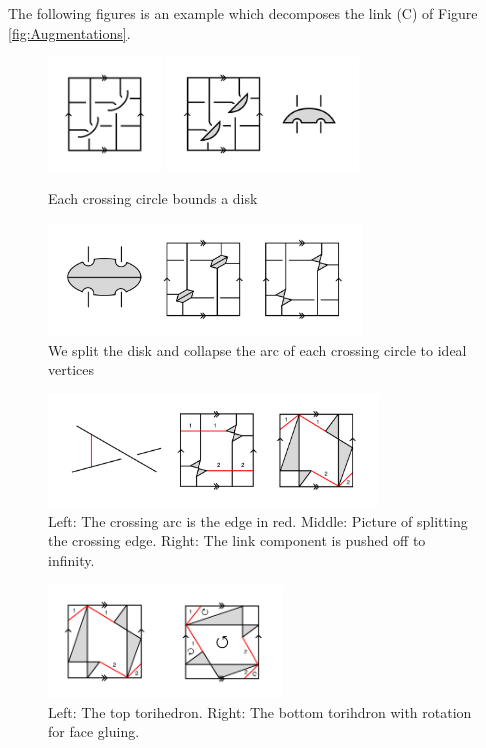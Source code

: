 \documentclass[11pt]{amsart}
\theoremstyle{plain}
\theoremstyle{definition}
\begin{document}
The following figures is an example which decomposes the link (C) of Figure \ref{fig:Augmentations}.
 \begin{figure}[h]
 \centering
 \includegraphics [height=3cm]{fig-3}
 \includegraphics [height=3cm]{fig-4}
 \caption{Each crossing circle bounds a disk}
 \end{figure}
 
 \vspace*{-0.5cm}
  \begin{figure}[h]
\centering
 \includegraphics [height=3cm]{fig-5}
 \caption{We split the disk and collapse the arc of each crossing circle to ideal vertices}
 \end{figure}
 
  \vspace*{-0.5cm}
  \begin{figure}[h]
 \centering
 \includegraphics [height=3cm]{fig-6}
 \caption{Left: The crossing arc is the edge in red. Middle: Picture of splitting the crossing edge. Right: The link component is pushed off to infinity.}
 \end{figure}

 \vspace*{-0.5cm}
 \begin{figure}[h]
 \centering
 \includegraphics [height=3cm]{top-bottom}
 \caption{Left: The top torihedron. Right: The bottom torihdron with rotation for face gluing.}
 \label{fig:top-bottom}
 \end{figure}
\end{document}
